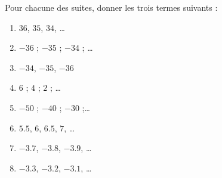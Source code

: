 
\begin{exercice}\label{exo2smath-0054}

    Pour chacune des suites, donner les trois termes suivants :
    \begin{enumerate}
        \item
            \( 36\), \( 35\), \( 34\), \ldots
        \item
            $-36$ ; $-35$ ; $-34$ ; \ldots
        \item
            \( -34\), \( -35\), \( -36\)
\item
 $6$ ; $4$ ; $2$ ; \ldots
\item
 $-50$ ; $-40$ ; $-30$ ;\ldots
            \item
                \( 5.5\), \( 6\), \( 6.5\), \( 7\), \ldots
            \item
                \( -3.7\), \( -3.8\), \( -3.9\), \ldots
            \item
                \( -3.3\), \( -3.2\),  \( -3.1\), \ldots
    \end{enumerate}

\end{exercice}
